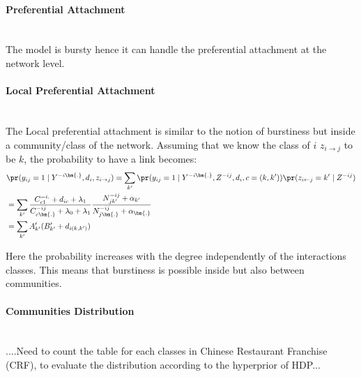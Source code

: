 \paragraph{Preferential Attachment}~\\

The model is bursty hence it can handle the preferential attachment at the network level.

\paragraph{Local Preferential Attachment}~\\

The Local preferential attachment is similar to the notion of burstiness but inside a community/class of the network. Assuming that we know the class of $i$ $z_{i\rightarrow j}$ to be $k$, the probability to have a link becomes: 
\begin{align}
&\pr(y_{ij}=1 \mid Y^{-i\bm{.}}, d_i,z_{i\rightarrow j})  = \sum_{k'} \pr(y_{ij}=1 \mid Y^{-i\bm{.}}, Z^{-ij}, d_i , c=(k,k')) \pr(z_{i\leftarrow j}=k' \mid Z^{-ij} ) \\
&= \sum_{k'} \frac{C_{c1}^{-i.} + d_{ic} + \lambda_1}{C_{c\bm{.}}^{-ij} + \lambda_0 + \lambda_1} \frac{N_{jk'}^{-ij} + \alpha_{k'}}{ N_{j\bm{.}}^{-ij} + \alpha_{\bm{.}} } \\
&= \sum_{k'} A'_{k'} (B'_{k'} + d_{i(k,k')})
\end{align}

Here the probability increases with the degree independently of the interactions classes. This means that burstiness is possible inside but also between communities.

\paragraph{Communities Distribution}~\\

....Need to count the table for each classes in Chinese Restaurant Franchise (CRF), to evaluate the distribution according to the hyperprior of HDP...



